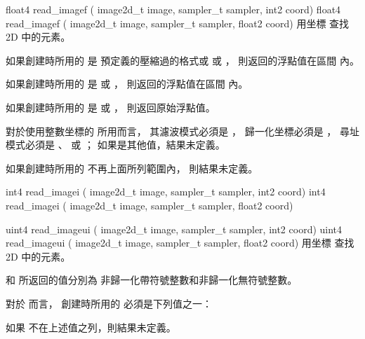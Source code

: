 
float4 read_imagef (
	image2d_t image,
	sampler_t sampler,
	int2 coord)
float4 read_imagef (
	image2d_t image,
	sampler_t sampler,
	float2 coord)
\stopbuffer
{}
用坐標  查找 2D   中的元素。

如果創建時所用的  是
預定義的壓縮過的格式或  或 ，
則返回的浮點值在區間 \math{[0.0 \cdots 1.0]} 內。

如果創建時所用的  是
  或 ，
則返回的浮點值在區間 \math{[-1.0 \cdots 1.0]} 內。

如果創建時所用的  是
  或 ，
則返回原始浮點值。

對於使用整數坐標的  所用而言，
其濾波模式必須是 ，
歸一化坐標必須是 ，
尋址模式必須是 、 
 或 ；
如果是其他值，結果未定義。

如果創建時所用的  不再上面所列範圍內，
則結果未定義。
\stopbuffer

int4 read_imagei (
	image2d_t image,
	sampler_t sampler,
	int2 coord)
int4 read_imagei (
	image2d_t image,
	sampler_t sampler,
	float2 coord)

uint4 read_imageui (
	image2d_t image,
	sampler_t sampler,
	int2 coord)
uint4 read_imageui (
	image2d_t image,
	sampler_t sampler,
	float2 coord)
\stopbuffer
{}
用坐標  查找 2D   中的元素。

 和  所返回的值分別為
非歸一化帶符號整數和非歸一化無符號整數。

對於  而言，
創建時所用的  必須是下列值之一：
\startigBase[indentnext=no]
\item {}
\item {}
\item {}
\stopigBase
如果  不在上述值之列，則結果未定義。

